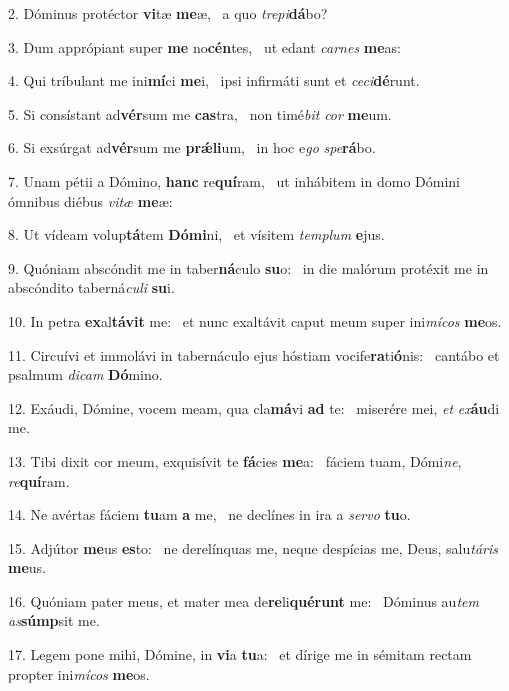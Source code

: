 2. Dóminus protéctor \textbf{vi}tæ \textbf{me}æ, \ast\  a quo \textit{tre}\textit{pi}\textbf{dá}bo?\

3. Dum apprópiant super \textbf{me} no\textbf{cén}tes, \ast\  ut edant \textit{car}\textit{nes} \textbf{me}as:\

4. Qui tríbulant me ini\textbf{mí}ci \textbf{me}i, \ast\  ipsi infirmáti sunt et \textit{ce}\textit{ci}\textbf{dé}runt.\

5. Si consístant ad\textbf{vér}sum me \textbf{cas}tra, \ast\  non timé\textit{bit} \textit{cor} \textbf{me}um.\

6. Si exsúrgat ad\textbf{vér}sum me \textbf{prǽ}\textbf{li}um, \ast\  in hoc e\textit{go} \textit{spe}\textbf{rá}bo.\

7. Unam pétii a Dómino, \textbf{hanc} re\textbf{quí}ram, \ast\  ut inhábitem in domo Dómini ómnibus diébus \textit{vi}\textit{tæ} \textbf{me}æ:\

8. Ut vídeam volup\textbf{tá}tem \textbf{Dó}\textbf{mi}ni, \ast\  et vísitem \textit{tem}\textit{plum} \textbf{e}jus.\

9. Quóniam abscóndit me in taber\textbf{ná}culo \textbf{su}o: \ast\  in die malórum protéxit me in abscóndito taberná\textit{cu}\textit{li} \textbf{su}i.\

10. In petra \textbf{ex}al\textbf{tá}\textbf{vit} me: \ast\  et nunc exaltávit caput meum super ini\textit{mí}\textit{cos} \textbf{me}os.\

11. Circuívi et immolávi in tabernáculo ejus hóstiam vocife\textbf{ra}ti\textbf{ó}nis: \ast\  cantábo et psalmum \textit{di}\textit{cam} \textbf{Dó}mino.\

12. Exáudi, Dómine, vocem meam, qua cla\textbf{má}vi \textbf{ad} te: \ast\  miserére mei, \textit{et} \textit{ex}\textbf{áu}di me.\

13. Tibi dixit cor meum, exquisívit te \textbf{fá}cies \textbf{me}a: \ast\  fáciem tuam, Dómi\textit{ne}, \textit{re}\textbf{quí}ram.\

14. Ne avértas fáciem \textbf{tu}am \textbf{a} me, \ast\  ne declínes in ira a \textit{ser}\textit{vo} \textbf{tu}o.\

15. Adjútor \textbf{me}us \textbf{es}to: \ast\  ne derelínquas me, neque despícias me, Deus, salu\textit{tá}\textit{ris} \textbf{me}us.\

16. Quóniam pater meus, et mater mea de\textbf{re}li\textbf{qué}\textbf{runt} me: \ast\  Dóminus au\textit{tem} \textit{as}\textbf{súmp}sit me.\

17. Legem pone mihi, Dómine, in \textbf{vi}a \textbf{tu}a: \ast\  et dírige me in sémitam rectam propter ini\textit{mí}\textit{cos} \textbf{me}os.\

